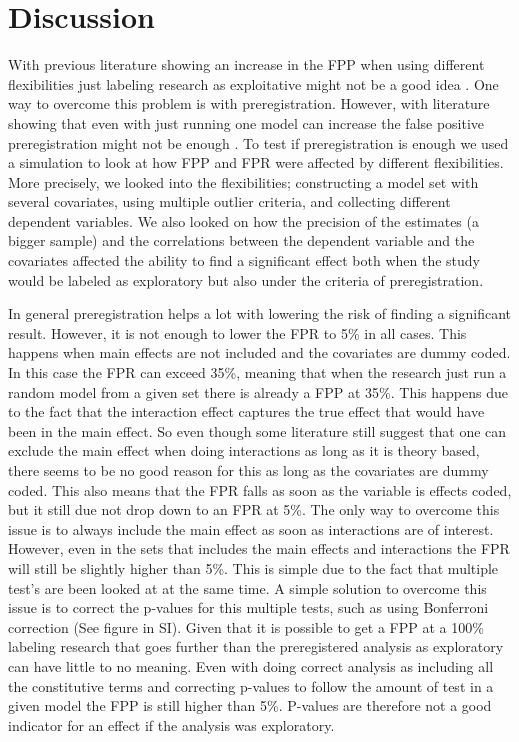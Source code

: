 \section{Discussion}
With previous literature showing an increase in the FPP when using different flexibilities just labeling research as exploitative might not be a good idea \citep{Simmons2011}. One way to overcome this problem is with preregistration. However, with literature showing that even with just running one model can increase the false positive preregistration might not be enough \citep{Dennis2019,Litiere2007}. To test if preregistration is enough we used a simulation to look at how FPP and FPR were affected by different flexibilities. More precisely, we looked into the flexibilities; constructing a model set with several covariates, using multiple outlier criteria, and collecting different dependent variables. We also looked on how the precision of the estimates (a bigger sample) and the correlations between the dependent variable and the covariates affected the ability to find a significant effect both when the study would be labeled as exploratory but also under the criteria of preregistration. 

In general preregistration helps a lot with lowering the risk of finding a significant result. However, it is not enough to lower the FPR to 5\%  in all cases. This happens when main effects are not included and the covariates are dummy coded. In this case the FPR can exceed 35\%, meaning that when the research just run a random model from a given set there is already a FPP at 35\%. This happens due to the fact that the interaction effect captures the true effect that would have been in the main effect. So even though some literature still suggest that one can exclude the main effect when doing interactions as long as it is theory based, there seems to be no good reason for this as long as the covariates are dummy coded. This also means that the FPR falls as soon as the variable is effects coded, but it still due not drop down to an FPR at 5\%. The only way to overcome this issue is to always include the main effect as soon as interactions are of interest. However, even in the sets that includes the main effects and interactions the FPR will still be slightly higher than 5\%. This is simple due to the fact that multiple test's are been looked at at the same time. A simple solution to overcome this issue is to correct the p-values for this multiple tests, such as using Bonferroni correction \citep{dunn1961multiple} (See figure in SI).  
Given that it is possible to get a FPP at a 100\% labeling research that goes further than the preregistered analysis as exploratory can have little to no meaning. Even with doing correct analysis as including all the constitutive terms and correcting p-values to follow the amount of test in a given model the FPP is still higher than 5\%. P-values are therefore not a good indicator for an effect if the analysis was exploratory. 
    
